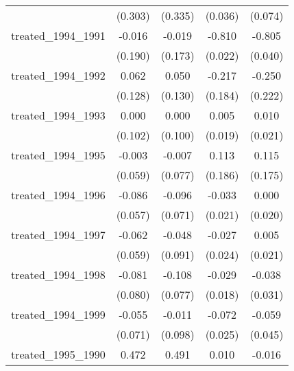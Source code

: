 {\begin{tabular}{l*{4}{c}}
            &     (0.303)         &     (0.335)         &     (0.036)         &     (0.074)         \\
[1em]
treated\_1994\_1991&      -0.016         &      -0.019         &      -0.810\sym{***}&      -0.805\sym{***}\\
            &     (0.190)         &     (0.173)         &     (0.022)         &     (0.040)         \\
[1em]
treated\_1994\_1992&       0.062         &       0.050         &      -0.217         &      -0.250         \\
            &     (0.128)         &     (0.130)         &     (0.184)         &     (0.222)         \\
[1em]
treated\_1994\_1993&       0.000         &       0.000         &       0.005         &       0.010         \\
            &     (0.102)         &     (0.100)         &     (0.019)         &     (0.021)         \\
[1em]
treated\_1994\_1995&      -0.003         &      -0.007         &       0.113         &       0.115         \\
            &     (0.059)         &     (0.077)         &     (0.186)         &     (0.175)         \\
[1em]
treated\_1994\_1996&      -0.086         &      -0.096         &      -0.033         &       0.000         \\
            &     (0.057)         &     (0.071)         &     (0.021)         &     (0.020)         \\
[1em]
treated\_1994\_1997&      -0.062         &      -0.048         &      -0.027         &       0.005         \\
            &     (0.059)         &     (0.091)         &     (0.024)         &     (0.021)         \\
[1em]
treated\_1994\_1998&      -0.081         &      -0.108         &      -0.029         &      -0.038         \\
            &     (0.080)         &     (0.077)         &     (0.018)         &     (0.031)         \\
[1em]
treated\_1994\_1999&      -0.055         &      -0.011         &      -0.072\sym{**} &      -0.059         \\
            &     (0.071)         &     (0.098)         &     (0.025)         &     (0.045)         \\
[1em]
treated\_1995\_1990&       0.472\sym{*}  &       0.491         &       0.010         &      -0.016         \\

\end{tabular}}
